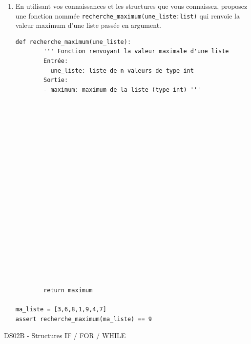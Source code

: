 \documentclass[a4paper,12pt,openany]{book}
\begin{document}
\begin{enumerate}
	\item En utilisant vos connaissances et les structures que vous connaissez, proposez une fonction nommée \verb+recherche_maximum(une_liste:list)+ qui renvoie la valeur maximum d'une liste passée en argument.
	
\begin{lstlisting}[numbers=none]
def recherche_maximum(une_liste):
		''' Fonction renvoyant la valeur maximale d'une liste
		Entrée:
		- une_liste: liste de n valeurs de type int
		Sortie:
		- maximum: maximum de la liste (type int) '''




















		return maximum
		
ma_liste = [3,6,8,1,9,4,7]
assert recherche_maximum(ma_liste) == 9
\end{lstlisting}	
	
\end{enumerate}


\newpage

\begin{center}\begin{large}
DS02B - Structures IF / FOR / WHILE
\end{large}\end{center}
\end{document}

